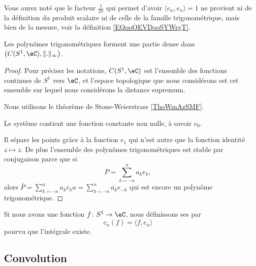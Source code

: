 \begin{remark}
    Vous aurez noté que le facteur \( \frac{1}{ 2\pi }\) qui permet d'avoir \( \langle e_n, e_n\rangle=1 \) ne provient ni de la définition du produit scalaire ni de celle de la famille trigonométrique, mais bien de la mesure, voir la définition \ref{EQooOEVDooSYWrgT}.
\end{remark}

\begin{proposition}     \label{PROPooTGBHooXGhdPR}
    Les polynômes trigonométriques forment une partie dense dans \( \big( C(S^1,\eC),\| . \|_{\infty} \big)\).
\end{proposition}

\begin{proof}
    Pour préciser les notations, \( C(S^1,\eC)\) est l'ensemble des fonctions continues de \( S^1\) vers \( \eC\), et l'espace topologique que nous considérons est cet ensemble sur lequel nous considérons la distance supremum.

    Nous utilisons le théorème de Stone-Weierstrass \ref{ThoWmAzSMF}.

    Le système contient une fonction constante non nulle, à savoir \( e_0\).

    Il sépare les points grâce à la fonction \( e_1\) qui n'est autre que la fonction identité \( z\mapsto z\). De plus l'ensemble des polynômes trigonométriques est stable par conjugaison parce que si
    \begin{equation}
        P=\sum_{k=-n}^na_ke_k,
    \end{equation}
    alors \( \bar P=\sum_{k=-n}^n\overline{ a_k e_ka}=\sum_{k=-n}^n\overline{ a_k }e_{-k}\) qui est encore un polynôme trigonométrique.
\end{proof}

\begin{definition}
    Si nous avons une fonction \( f\colon S^1\to \eC\), nous définissons ses  par
    \begin{equation}
        c_n(f)=\langle f, e_n\rangle 
    \end{equation}
    pourvu que l'intégrale existe.
\end{definition}

\subsection{Convolution}

